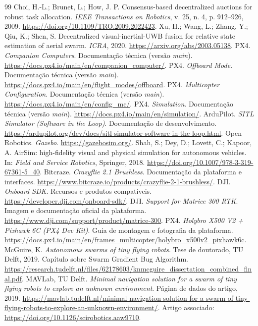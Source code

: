 \documentclass[11pt,a4paper,oneside]{book}
\numberwithin{equation}{chapter}
\begin{document}
\begin{thebibliography}{99}
 Choi, H.-L.; Brunet, L.; How, J. P. Consensus-based decentralized auctions for robust task allocation. \emph{IEEE Transactions on Robotics}, v. 25, n. 4, p. 912--926, 2009. \url{https://doi.org/10.1109/TRO.2009.2022423}.
 Xu, H.; Wang, L.; Zhang, Y.; Qiu, K.; Shen, S. Decentralized visual-inertial-UWB fusion for relative state estimation of aerial swarm. \emph{ICRA}, 2020. \url{https://arxiv.org/abs/2003.05138}.
 PX4. \emph{Companion Computers}. Documentação técnica (versão \emph{main}). \url{https://docs.px4.io/main/en/companion_computer/}.
 PX4. \emph{Offboard Mode}. Documentação técnica (versão \emph{main}). \url{https://docs.px4.io/main/en/flight_modes/offboard}.
 PX4. \emph{Multicopter Configuration}. Documentação técnica (versão \emph{main}). \url{https://docs.px4.io/main/en/config_mc/}.
 PX4. \emph{Simulation}. Documentação técnica (versão \emph{main}). \url{https://docs.px4.io/main/en/simulation/}.
 ArduPilot. \emph{SITL Simulator (Software in the Loop)}. Documentação de desenvolvimento. \url{https://ardupilot.org/dev/docs/sitl-simulator-software-in-the-loop.html}.
 Open Robotics. \emph{Gazebo}. \url{https://gazebosim.org/}.
 Shah, S.; Dey, D.; Lovett, C.; Kapoor, A. AirSim: high-fidelity visual and physical simulation for autonomous vehicles. In: \emph{Field and Service Robotics}, Springer, 2018. \url{https://doi.org/10.1007/978-3-319-67361-5_40}.
 Bitcraze. \emph{Crazyflie 2.1 Brushless}. Documentação da plataforma e interfaces. \url{https://www.bitcraze.io/products/crazyflie-2-1-brushless/}.
 DJI. \emph{Onboard SDK}. Recursos e produtos compatíveis. \url{https://developer.dji.com/onboard-sdk/}.
 DJI. \emph{Support for Matrice 300 RTK}. Imagem e documentação oficial da plataforma. \url{https://www.dji.com/support/product/matrice-300}.
 PX4. \emph{Holybro X500 V2 + Pixhawk 6C (PX4 Dev Kit)}. Guia de montagem e fotografia da plataforma. \url{https://docs.px4.io/main/en/frames_multicopter/holybro_x500v2_pixhawk6c}.
 McGuire, K. \emph{Autonomous swarms of tiny flying robots}. Tese de doutorado, TU Delft, 2019. Capítulo sobre Swarm Gradient Bug Algorithm. \url{https://research.tudelft.nl/files/62178603/knmcguire_dissertation_combined_final.pdf}.
 MAVLab, TU Delft. \emph{Minimal navigation solution for a swarm of tiny flying robots to explore an unknown environment}. Página de dados do artigo, 2019. \url{https://mavlab.tudelft.nl/minimal-navigation-solution-for-a-swarm-of-tiny-flying-robots-to-explore-an-unknown-environment/}. Artigo associado: \url{https://doi.org/10.1126/scirobotics.aaw9710}.

\end{thebibliography}
\end{document}
